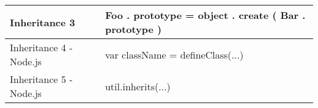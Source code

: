\begin{table}[]
\begin{tabular}{|p{5cm}|p{9cm}|}
	Inheritance 3                  & Foo . prototype = object . create ( Bar . prototype )                                                                                      \\ \hline
	Inheritance 4 - Node.js        & var className = defineClass(...)                                                                                                           \\ \hline
	Inheritance 5 - Node.js        & util.inherits(...)                                                                                                                         \\ \hline
\end{tabular}
\end{table}